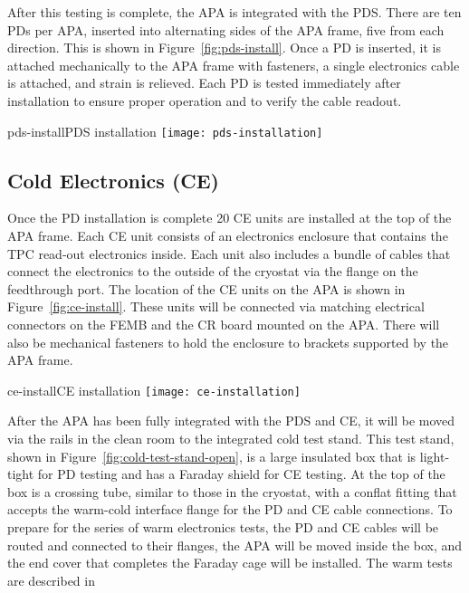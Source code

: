 After this testing is complete, the APA is integrated with the PDS.  There are ten PDs per APA, inserted into alternating sides of the APA frame, %
five from each direction.  This is shown in Figure~\ref{fig:pds-install}.  Once a PD is inserted, it is attached mechanically to the APA frame with fasteners, a single electronics cable is attached, and strain is relieved.  Each PD is tested immediately after installation to ensure proper operation and to verify the cable readout.  

\begin{cdrfigure}{pds-install}{PDS installation}
\texttt{[image: pds-installation]}
\end{cdrfigure}

\subsection{Cold Electronics (CE)}
\label{subsec:ce_install}

Once the PD installation is complete 20 CE units are installed at the top of the APA frame.  Each CE unit consists of an electronics enclosure that contains the TPC read-out electronics inside.  Each unit also includes a bundle of cables that connect the electronics to the outside of the cryostat via the flange on the feedthrough port.  %
The location of the CE units on the APA is shown in Figure~\ref{fig:ce-install}.  These units will be connected via matching electrical connectors on the FEMB and the CR board mounted on the APA.  There will also be mechanical fasteners to hold the enclosure to brackets supported by the APA frame.  %

\begin{cdrfigure}[CE installation]{ce-install}{CE installation}
\texttt{[image: ce-installation]}
\end{cdrfigure}

After the APA has been fully integrated with the PDS and CE, it will be moved via the rails in the clean room to the integrated cold test stand.  This test stand, shown in Figure~\ref{fig:cold-test-stand-open}, is a large insulated box that is light-tight for PD testing and has a Faraday shield for CE testing.  At the top of the box is a crossing tube, similar to those in the cryostat, with a conflat fitting that accepts the warm-cold interface flange for the PD and CE cable connections.  To prepare for the series of warm electronics tests, the PD and CE cables will be routed and connected to their flanges, the APA will be moved inside the box, and the end cover that completes the Faraday cage will be installed.  The warm tests are described in   

